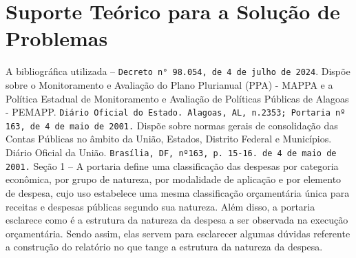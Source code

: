 \documentclass[12pt,a4paper]{article}
\begin{document}
	\section{Suporte Teórico para a Solução de Problemas}
	\hspace*{1,5cm}A bibliográfica utilizada – \texttt{Decreto n° 98.054, de 4 de julho de 2024}. Dispõe sobre o 
	Monitoramento e Avaliação do Plano Plurianual (PPA) - MAPPA e a Política Estadual de 
	Monitoramento e Avaliação de Políticas Públicas de Alagoas - PEMAPP. \texttt{Diário Oficial do 
	Estado. Alagoas, AL, n.2353; Portaria nº 163, de 4 de maio de 2001.} Dispõe sobre normas 
	gerais de consolidação das Contas Públicas no âmbito da União, Estados, Distrito Federal e 
	Municípios. Diário Oficial da União. \texttt{Brasília, DF, nº163, p. 15-16. de 4 de maio de 2001.} 
	Seção 1 – A portaria define uma classificação das despesas por categoria econômica, por grupo 
	de natureza, por modalidade de aplicação e por elemento de despesa, cujo uso estabelece uma 
	mesma classificação orçamentária única para receitas e despesas públicas segundo sua natureza. 
	Além disso, a portaria esclarece como é a estrutura da natureza da despesa a ser observada na 
	execução orçamentária. Sendo assim, elas servem para esclarecer algumas dúvidas referente a 
	construção do relatório no que tange a estrutura da natureza da despesa. %
	
\end{document}
